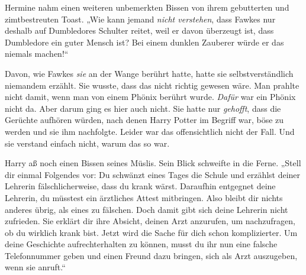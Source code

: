 Hermine nahm einen weiteren unbemerkten Bissen von ihrem gebutterten und zimtbestreuten Toast.
„Wie kann jemand \emph{nicht verstehen}, dass Fawkes nur deshalb auf Dumbledores Schulter reitet, weil er davon überzeugt ist, dass Dumbledore ein guter Mensch ist? Bei einem dunklen Zauberer würde er das niemals machen!“

Davon, wie Fawkes \emph{sie} an der Wange berührt hatte, hatte sie selbstverständlich niemandem erzählt. Sie wusste, dass das nicht richtig gewesen wäre. Man prahlte nicht damit, wenn man von einem Phönix berührt wurde. \emph{Dafür} war ein Phönix nicht da.
%
%
%
Aber darum ging es hier auch nicht. Sie hatte nur \emph{gehofft}, dass die Gerüchte aufhören würden, nach denen Harry Potter im Begriff war, böse zu werden und sie ihm nachfolgte.
%
Leider war das offensichtlich nicht der Fall.
%
Und sie verstand einfach nicht, warum das so war.

Harry aß noch einen Bissen seines Müslis. Sein Blick schweifte in die Ferne.
„Stell dir einmal Folgendes vor: Du schwänzt eines Tages die Schule und erzählst deiner Lehrerin fälschlicherweise, dass du krank wärst. Daraufhin entgegnet deine Lehrerin, du müsstest ein ärztliches Attest mitbringen. Also bleibt dir nichts anderes übrig, als eines zu fälschen. Doch damit gibt sich deine Lehrerin nicht zufrieden. Sie erklärt dir ihre Absicht, deinen Arzt anzurufen, um nachzufragen, ob du wirklich krank bist. Jetzt wird die Sache für dich schon komplizierter. Um deine Geschichte aufrechterhalten zu können, musst du ihr nun eine falsche Telefonnummer geben und einen Freund dazu bringen, sich als Arzt auszugeben, wenn sie anruft.“

